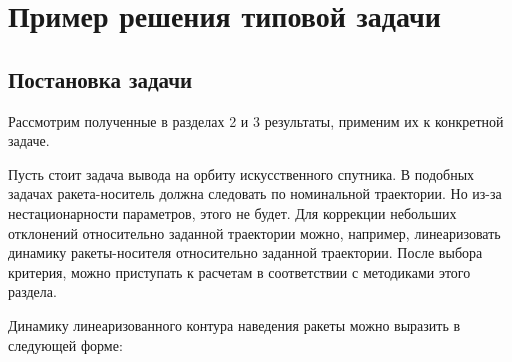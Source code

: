 


\chapter{Пример решения типовой задачи}
\renewcommand{\optU}{  \optimum{\m{u}}  } %
\renewcommand{\funcF}{ \calf{F}         } %

\renewcommand{\optF}{  \optimum{\funcF} } %
\newcommand{\funcS}{   \calf{S}         } %



\section{Постановка задачи}



Рассмотрим полученные в разделах 2 и 3 результаты, применим их к конкретной задаче.

Пусть стоит задача вывода на орбиту искусственного спутника. В подобных задачах ракета-носитель должна следовать по номинальной траектории. Но из-за нестационарности параметров, этого не будет. Для коррекции небольших отклонений относительно заданной траектории можно, например, линеаризовать динамику ракеты-носителя относительно заданной траектории. После выбора критерия, можно приступать к расчетам в соответствии с методиками этого раздела.

Динамику линеаризованного контура наведения ракеты можно выразить в следующей форме:

\eeq

